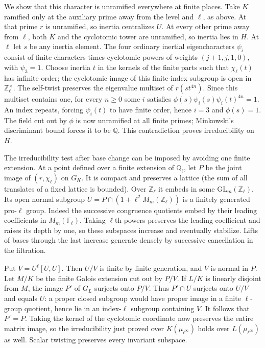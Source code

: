 \documentclass[11pt]{amsart}
\theoremstyle{definition}
\theoremstyle{remark}
\begin{document}
We show that this character is unramified everywhere at finite
places. Take $K$ ramified only at the auxiliary prime away from
the level and $\ell$, as above. At that prime $r$ is unramified,
so inertia centralizes $U$. At every other prime away from $\ell$,
both $K$ and the cyclotomic tower are unramified, so inertia lies
in $H$. At $\ell$ let $s$ be any inertia element. The four ordinary
inertial eigencharacters $\psi_i$ consist of finite characters
times cyclotomic powers of weights $(j+1,j,1,0)$, with $\psi_3=1$.
Choose inertia $t$ in the kernels of the finite parts such that
$\chi_\ell(t)$ has infinite order; the cyclotomic image of this
finite-index subgroup is open in $\mathbb Z_\ell^\times$.
The self-twist preserves the eigenvalue multiset of $r(st^{4n})$.
Since this multiset contains one, for every $n\ge0$ some $i$ satisfies
$\phi(s)\psi_i(s)\psi_i(t)^{4n}=1$. An index repeats, forcing
$\psi_i(t)$ to have finite order, hence $i=3$ and $\phi(s)=1$.
The field cut out by $\phi$ is now unramified at all finite primes;
Minkowski's discriminant bound forces it to be $\mathbb Q$.
This contradiction proves irreducibility on $H$.

The irreducibility test after base change can be imposed by avoiding
one finite extension. At a point defined over a finite extension of
$\mathbb Q_\ell$, let $P$ be the joint image of $(r,\chi_\ell)$
on $G_K$. It is compact and preserves a lattice (the sum of all
translates of a fixed lattice is bounded). Over $\mathbb Z_\ell$
it embeds in some $\mathrm{GL}_m(\mathbb Z_\ell)$. Its open normal
subgroup $U=P\cap(1+\ell^2 M_m(\mathbb Z_\ell))$ is a finitely
generated pro-$\ell$ group. Indeed the successive congruence quotients
embed by their leading coefficients in $M_m(\mathbb F_\ell)$.
Taking $\ell$th powers preserves the leading coefficient and raises
its depth by one, so these subspaces increase and eventually stabilize.
Lifts of bases through the last
increase generate densely by successive cancellation in the filtration.

Put $V=\overline{U^\ell[U,U]}$. Then $U/V$ is finite by finite
generation, and $V$ is normal in $P$. Let $M/K$ be the finite Galois
extension cut out by $P/V$. If $L/K$ is linearly disjoint from $M$,
the image $P'$ of $G_L$ surjects onto $P/V$. Thus $P'\cap U$
surjects onto $U/V$ and equals $U$: a proper closed subgroup would
have proper image in a finite $\ell$-group quotient, hence lie in
an index-$\ell$ subgroup containing $V$. It follows that $P'=P$.
Taking the kernel of the cyclotomic coordinate now preserves the
entire matrix image, so the irreducibility just proved over
$K(\mu_{\ell^\infty})$ holds over $L(\mu_{\ell^\infty})$ as well.
Scalar twisting preserves every invariant subspace.
\end{document}
